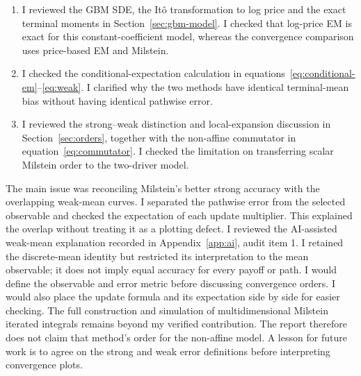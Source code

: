\begin{enumerate}[leftmargin=2em,itemsep=2pt,topsep=2pt]
\item I reviewed the GBM SDE, the It\^o transformation to log price and the exact terminal moments in Section~\ref{sec:gbm-model}. I checked that log-price EM is exact for this constant-coefficient model, whereas the convergence comparison uses price-based EM and Milstein.
\item I checked the conditional-expectation calculation in equations~\eqref{eq:conditional-em}--\eqref{eq:weak}. I clarified why the two methods have identical terminal-mean bias without having identical pathwise error.
\item I reviewed the strong--weak distinction and local-expansion discussion in Section~\ref{sec:orders}, together with the non-affine commutator in equation~\eqref{eq:commutator}. I checked the limitation on transferring scalar Milstein order to the two-driver model.
\end{enumerate}
The main issue was reconciling Milstein's better strong accuracy with the overlapping weak-mean curves. I separated the pathwise error from the selected observable and checked the expectation of each update multiplier. This explained the overlap without treating it as a plotting defect.
I reviewed the AI-assisted weak-mean explanation recorded in Appendix~\ref{app:ai}, audit item 1. I retained the discrete-mean identity but restricted its interpretation to the mean observable; it does not imply equal accuracy for every payoff or path.
I would define the observable and error metric before discussing convergence orders. I would also place the update formula and its expectation side by side for easier checking.
The full construction and simulation of multidimensional Milstein iterated integrals remains beyond my verified contribution. The report therefore does not claim that method's order for the non-affine model.
A lesson for future work is to agree on the strong and weak error definitions before interpreting convergence plots.
\IndividualStatementEnd

